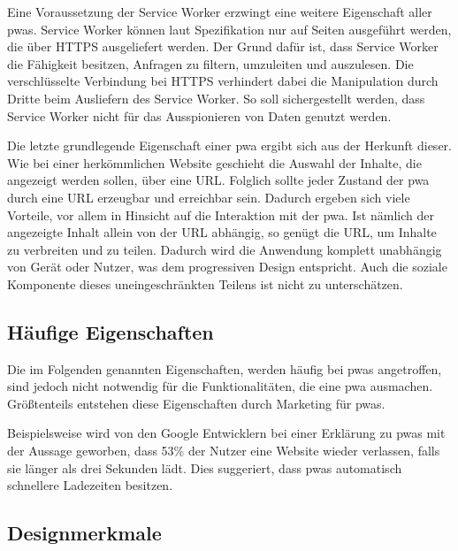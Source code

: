 \documentclass[12pt, parskip=half]{scrartcl}       %
\begin{document}
Eine Voraussetzung der Service Worker erzwingt eine weitere Eigenschaft aller \acp{pwa}.
Service Worker können laut Spezifikation nur auf Seiten ausgeführt werden, die über HTTPS ausgeliefert werden.
Der Grund dafür ist, dass Service Worker die Fähigkeit besitzen, Anfragen zu filtern, umzuleiten und auszulesen.
Die verschlüsselte Verbindung bei HTTPS verhindert dabei die Manipulation durch Dritte beim Ausliefern des Service Worker.
So soll sichergestellt werden, dass Service Worker nicht für das Ausspionieren von Daten genutzt werden\cite{ServiceWorker_explained}.

Die letzte grundlegende Eigenschaft einer \ac{pwa} ergibt sich aus der Herkunft dieser.
Wie bei einer herkömmlichen Website geschieht die Auswahl der Inhalte, die angezeigt werden sollen, über eine URL.
Folglich sollte jeder Zustand der \ac{pwa} durch eine URL erzeugbar und erreichbar sein.
Dadurch ergeben sich viele Vorteile, vor allem in Hinsicht auf die Interaktion mit der \ac{pwa}.
Ist nämlich der angezeigte Inhalt allein von der URL abhängig, so genügt die URL, um Inhalte zu verbreiten und zu teilen.
Dadurch wird die Anwendung komplett unabhängig von Gerät oder Nutzer, was dem progressiven Design entspricht.
Auch die soziale Komponente dieses uneingeschränkten Teilens ist nicht zu unterschätzen.


\subsection{Häufige Eigenschaften}

Die im Folgenden genannten Eigenschaften, werden häufig bei \acp{pwa} angetroffen, sind jedoch nicht notwendig für die Funktionalitäten, die eine \ac{pwa} ausmachen.
Größtenteils entstehen diese Eigenschaften durch Marketing für \acp{pwa}.

Beispielsweise wird von den Google Entwicklern bei einer Erklärung zu \acp{pwa} mit der Aussage geworben, dass 53\% der Nutzer eine Website wieder verlassen, falls sie länger als drei Sekunden lädt.\cite{googledevs_performance}
Dies suggeriert, dass \acp{pwa} automatisch schnellere Ladezeiten besitzen.


\subsection{Designmerkmale}
\end{document}
